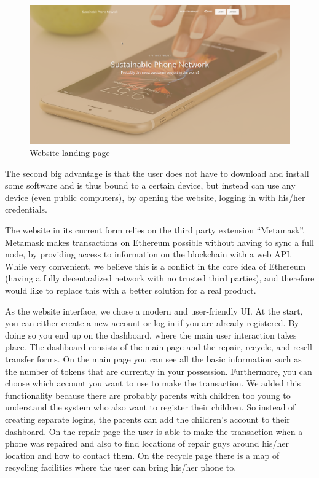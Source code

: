 \documentclass[11pt]{scrartcl}
\begin{document}
\begin{figure}[H]
    \includegraphics[width=\textwidth]{img/main_web}
    \caption{Website landing page}%
    \label{fig:main_web}
\end{figure}

The second big advantage is that the user does not have to download and install some software and is thus bound to a certain device, but instead can use any device (even public computers), by opening the website, logging in with his/her credentials.

The website in its current form relies on the third party extension ``Metamask''. Metamask makes transactions on Ethereum possible without having to sync a full node, by providing access to information on the blockchain with a web API. While very convenient, we believe this is a conflict in the core idea of Ethereum (having a fully decentralized network with no trusted third parties), and therefore would like to replace this with a better solution for a real product.

As the website interface, we chose a modern and user-friendly UI. At the start, you can either create a new account or log in if you are already registered. By doing so you end up on the dashboard, where the main user interaction takes place. The dashboard consists of the main page and the repair, recycle, and resell transfer forms. On the main page you can see all the basic information such as the number of tokens that are currently in your possession. Furthermore, you can choose which account you want to use to make the transaction. We added this functionality because there are probably parents with children too young to understand the system who also want to register their children. So instead of creating separate logins, the parents can add the children's account to their dashboard. On the repair page the user is able to make the transaction when a phone was repaired and also to find locations of repair guys around his/her location and how to contact them. On the recycle page there is a map of recycling facilities where the user can bring his/her phone to.
\end{document}

